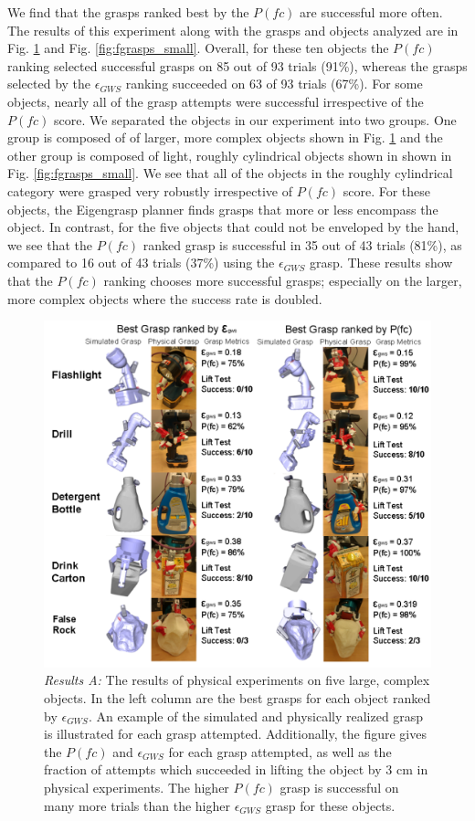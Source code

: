 We find that the grasps ranked best by the $P(fc)$ are successful more often. The results of this experiment along with the grasps and objects analyzed are in Fig. \ref{fig:fgrasps_large} and Fig. \ref{fig:fgrasps_small}. Overall, for these ten objects the $P(fc)$ ranking selected successful grasps on 85 out of 93 trials (91\%), whereas the grasps selected by the $\epsilon_{GWS}$ ranking succeeded on 63 of 93
trials (67\%).
For some objects, nearly all of the grasp attempts were successful irrespective of the $P(fc)$ score. We separated the objects in our experiment into two groups. One group is composed of of larger, more complex objects shown in Fig. \ref{fig:fgrasps_large} and the other group is composed of light, roughly cylindrical objects shown in shown in Fig. \ref{fig:fgrasps_small}. We see that all of the objects in the roughly cylindrical category were grasped very robustly irrespective of $P(fc)$ score. For these objects, the Eigengrasp planner finds grasps that more or less encompass the object. In contrast, for the five objects that could not be enveloped by the hand, we see that the $P(fc)$ ranked grasp is successful in 35 out of 43 trials (81\%), as compared to 16 out of 43 trials (37\%) using the $\epsilon_{GWS}$ grasp. These results show that the $P(fc)$ ranking chooses more successful grasps; especially on the larger, more complex objects where the success rate is doubled.

\begin{figure}
\centering
\includegraphics[width=\linewidth]{pfc_physical_grasps_large.png}
\caption{\emph{Results A:} The results of physical experiments on five large, complex objects. In the left column are the best grasps for each object ranked by $\epsilon_{GWS}$. An example of the simulated and physically realized grasp is illustrated for each grasp attempted. Additionally, the figure gives the $P(fc)$ and  $\epsilon_{GWS}$ for each grasp attempted, as well as the fraction of attempts which succeeded in lifting the object by 3 cm in physical experiments. The higher $P(fc)$ grasp is successful on many more trials than the higher  $\epsilon_{GWS}$ grasp for these objects.}
\label{fig:fgrasps_large}
\end{figure}

